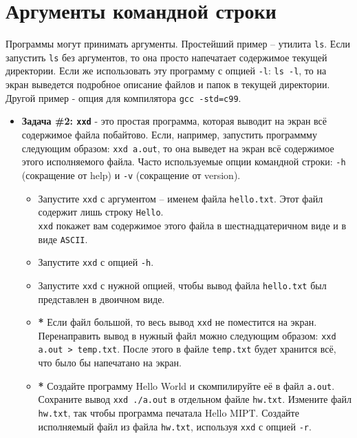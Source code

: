 \documentclass{article}
\begin{document}
\section*{Аргументы командной строки}
Программы могут принимать аргументы. Простейший пример -- утилита \texttt{ls}. Если запустить \texttt{ls} без аргументов, то она просто напечатает содержимое текущей директории.  Если же использовать эту программу с опцией \texttt{-l}: \texttt{ls -l}, то на экран выведется подробное описание файлов и папок в текущей директории. Другой пример - опция для компилятора \texttt{gcc -std=c99}.\\
\begin{itemize}

\item \textbf{Задача \#2: \texttt{xxd}} - это простая программа, которая выводит на экран всё содержимое файла побайтово. Если, например, запустить программму следующим образом:
\texttt{xxd a.out}, то она выведет на экран всё содержимое этого исполняемого файла. Часто используемые опции командной строки: \texttt{-h} (сокращение от help) и \texttt{-v} (сокращение от version).
\begin{itemize}
\item Запустите \texttt{xxd} с аргументом -- именем файла \texttt{hello.txt}. Этот файл содержит лишь строку \texttt{Hello}.\\ 
\texttt{xxd} покажет вам содержимое этого файла в шестнадцатеричном виде и в виде \texttt{ASCII}.
\item Запустите \texttt{xxd} с опцией \texttt{-h}.
\item Запустите \texttt{xxd} с нужной опцией, чтобы вывод файла \texttt{hello.txt} был представлен в двоичном виде.
\item \textbf{*} Если файл большой, то весь вывод \texttt{xxd} не поместится на экран. Перенаправить вывод в нужный файл можно следующим образом:
\texttt{xxd a.out > temp.txt}. После этого в файле \texttt{temp.txt} будет хранится всё, что было бы напечатано на экран.
\item \textbf{*} Создайте программу Hello World и скомпилируйте её в файл \texttt{a.out}. Сохраните вывод \texttt{xxd ./a.out} в отдельном файле \texttt{hw.txt}. Измените файл \texttt{hw.txt}, так чтобы программа печатала Hello MIPT. Создайте исполняемый файл из файла \texttt{hw.txt}, используя \texttt{xxd} с опцией \texttt{-r}.
\end{itemize}


\end{itemize}
\end{document}
